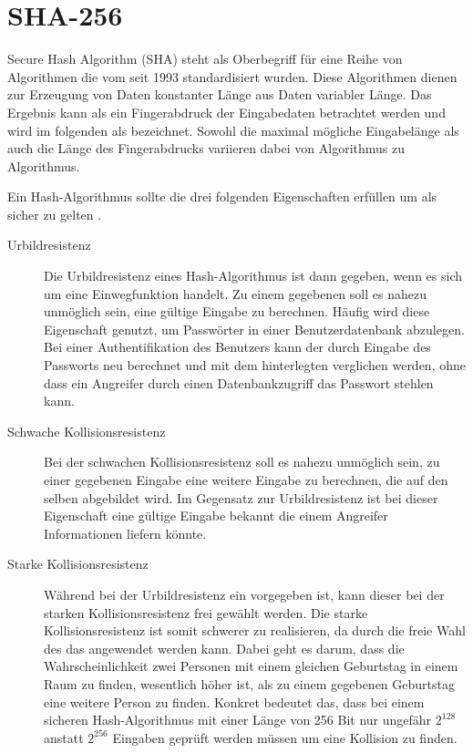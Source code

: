\chapter{SHA-256}
\label{chp:sha256}

Secure Hash Algorithm (SHA) steht als Oberbegriff für eine Reihe von Algorithmen die vom  seit 1993 standardisiert wurden.
Diese Algorithmen dienen zur Erzeugung von Daten konstanter Länge aus Daten variabler Länge.
Das Ergebnis kann als ein Fingerabdruck der Eingabedaten betrachtet werden und wird im folgenden als  bezeichnet.
Sowohl die maximal mögliche Eingabelänge als auch die Länge des Fingerabdrucks variieren dabei von Algorithmus zu Algorithmus.

Ein Hash-Algorithmus sollte die drei folgenden Eigenschaften erfüllen um als sicher zu gelten \cite{crypto1}.
\begin{description}
  \item[Urbildresistenz] Die Urbildresistenz eines Hash-Algorithmus ist dann gegeben, wenn es sich um eine Einwegfunktion handelt.
                         Zu einem gegebenen  soll es nahezu unmöglich sein, eine gültige Eingabe zu berechnen.
                         Häufig wird diese Eigenschaft genutzt, um Passwörter in einer Benutzerdatenbank abzulegen.
                         Bei einer Authentifikation des Benutzers kann der  durch Eingabe des Passworts neu berechnet und mit dem 
                         hinterlegten  verglichen werden, ohne dass ein Angreifer durch einen Datenbankzugriff das Passwort stehlen kann.
  \item[Schwache Kollisionsresistenz]
                         Bei der schwachen Kollisionsresistenz soll es nahezu unmöglich sein, zu einer gegebenen Eingabe eine weitere Eingabe zu berechnen,
                         die auf den selben  abgebildet wird. Im Gegensatz zur Urbildresistenz ist bei dieser Eigenschaft eine gültige
                         Eingabe bekannt die einem Angreifer Informationen liefern könnte.
  \item[Starke Kollisionsresistenz]
                         Während bei der Urbildresistenz ein  vorgegeben ist, kann dieser bei der starken Kollisionsresistenz frei gewählt werden.
                         Die starke Kollisionsresistenz ist somit schwerer zu realisieren, da durch die freie Wahl des  das 
                         angewendet werden kann. Dabei geht es darum, dass die Wahrscheinlichkeit zwei Personen mit einem gleichen Geburtstag in einem Raum
                         zu finden, wesentlich höher ist, als zu einem gegebenen Geburtstag eine weitere Person zu finden. Konkret bedeutet das, dass
                         bei einem sicheren Hash-Algorithmus mit einer Länge von 256 Bit nur ungefähr $ 2^{128} $ anstatt $ 2^{256} $ Eingaben geprüft werden
                         müssen um eine Kollision zu finden.                         
\end{description}

